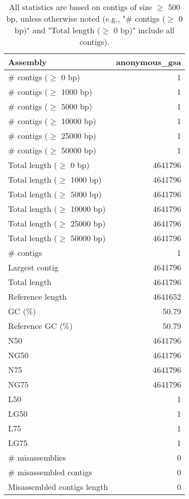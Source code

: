 \documentclass[12pt,a4paper]{article}
\begin{document}
\begin{table}[ht]
\begin{center}
\caption{All statistics are based on contigs of size $\geq$ 500 bp, unless otherwise noted (e.g., "\# contigs ($\geq$ 0 bp)" and "Total length ($\geq$ 0 bp)" include all contigs).}
\begin{tabular}{|l*{1}{|r}|}
\hline
Assembly & anonymous\_gsa \\ \hline
\# contigs ($\geq$ 0 bp) & 1 \\ \hline
\# contigs ($\geq$ 1000 bp) & 1 \\ \hline
\# contigs ($\geq$ 5000 bp) & 1 \\ \hline
\# contigs ($\geq$ 10000 bp) & 1 \\ \hline
\# contigs ($\geq$ 25000 bp) & 1 \\ \hline
\# contigs ($\geq$ 50000 bp) & 1 \\ \hline
Total length ($\geq$ 0 bp) & 4641796 \\ \hline
Total length ($\geq$ 1000 bp) & 4641796 \\ \hline
Total length ($\geq$ 5000 bp) & 4641796 \\ \hline
Total length ($\geq$ 10000 bp) & 4641796 \\ \hline
Total length ($\geq$ 25000 bp) & 4641796 \\ \hline
Total length ($\geq$ 50000 bp) & 4641796 \\ \hline
\# contigs & 1 \\ \hline
Largest contig & 4641796 \\ \hline
Total length & 4641796 \\ \hline
Reference length & 4641652 \\ \hline
GC (\%) & 50.79 \\ \hline
Reference GC (\%) & 50.79 \\ \hline
N50 & 4641796 \\ \hline
NG50 & 4641796 \\ \hline
N75 & 4641796 \\ \hline
NG75 & 4641796 \\ \hline
L50 & 1 \\ \hline
LG50 & 1 \\ \hline
L75 & 1 \\ \hline
LG75 & 1 \\ \hline
\# misassemblies & 0 \\ \hline
\# misassembled contigs & 0 \\ \hline
Misassembled contigs length & 0 \\ \hline

\end{tabular}
\end{center}
\end{table}
\end{document}
